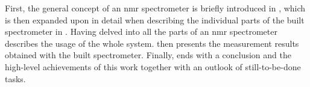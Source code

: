 First, the general concept of an \acrshort{nmr} spectrometer is briefly introduced in , which is then expanded upon in detail when describing the individual parts of the built spectrometer in . Having delved into all the parts of an \acrshort{nmr} spectrometer  describes the usage of the whole system.  then presents the measurement results obtained with the built spectrometer. Finally,  ends with a conclusion and the high-level achievements of this work together with an outlook of still-to-be-done tasks.
